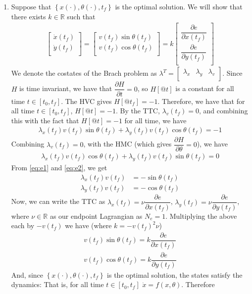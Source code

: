 \documentclass[10pt]{article}
\newcommand{\mat}[2][ccccccccccccccc]{\left [\!\!\begin{array}{#1} #2\\ \end{array} \!\!\right]}
\newcommand{\libzptrl}[2]{\dfrac{\partial #1}{\partial #2} }
\newcommand{\cbrace}[1]{\left\{#1\right\}}				%
\newcommand{\bbr}{\mathbb{R}}
\begin{document}
\begin{enumerate}[leftmargin=*]
    \begin{enumerate}
      \item Suppose that $\cbrace{x(\cdot), \theta(\cdot), t_f}$ is the optimal solution.  We will show that there exists $k\in\bbr$ such that
          \begin{align} \label{eq:Show}
            \mat{\dot x(t_f) \\ \dot y(t_f)}
                  = \mat{v(t_f)\sin\theta(t_f) \\ v(t_f)\cos\theta(t_f)}
                  = k\mat{\libzptrl{e}{x(t_f)} \\ \libzptrl{e}{y(t_f)}}
          \end{align}
          We denote the costates of the Brach problem as $\lambda^T=\mat{\lambda_x & \lambda_y & \lambda_v}$.  Since $H$ is time invariant, we have that $\libzptrl{H}{t}=0$, so $H[@t]$ is a constant for all time $t\in[t_0,t_f]$.  The HVC gives $H[@t_f]=-1$.  Therefore, we have that for all time $t\in[t_0,t_f]$, $H[@t]=-1$.  By the TTC, $\lambda_v(t_f)=0$, and combining this with the fact that $H[@t]=-1$ for all time, we have
          \begin{align} \label{eq:e1}
                \lambda_x(t_f)v(t_f)\sin\theta(t_f) + \lambda_y(t_f)v(t_f)\cos\theta(t_f) = -1
          \end{align}
          Combining  $\lambda_v(t_f)=0$, with the HMC (which gives $\libzptrl{H}{\theta}=0$), we have
          \begin{align} \label{eq:e2}
                \lambda_x(t_f)v(t_f)\cos\theta(t_f) + \lambda_y(t_f)v(t_f)\sin\theta(t_f) = 0
          \end{align}
          From \ref{eq:e1} and \ref{eq:e2}, we get
          \begin{align*}
            \lambda_x(t_f)v(t_f) &= -\sin\theta(t_f)\\
            \lambda_y(t_f)v(t_f) &= -\cos\theta(t_f)
          \end{align*}
          Now, we can write the TTC as $\lambda_x(t_f)=\nu\libzptrl{e}{x(t_f)}$, $\lambda_y(t_f)=\nu\libzptrl{e}{y(t_f)}$, where $\nu\in\bbr$ as our endpoint Lagrangian as $N_e=1$. Multiplying the above each by $-v(t_f)$ we have (where $k=-v(t_f)^2\nu$)
          \begin{align} \label{eq:L1}
            v(t_f)\sin\theta(t_f) = k\libzptrl{e}{x(t_f)}\\
            v(t_f)\cos\theta(t_f) = k\libzptrl{e}{y(t_f)}
          \end{align}
          And, since $\cbrace{x(\cdot), \theta(\cdot), t_f}$ is the optimal solution, the states satisfy the dynamics: That is, for all time $t\in[t_0,t_f]$ $\dot x = f(x,\theta)$.  Therefore

\end{enumerate}
\end{enumerate}
\end{document}
